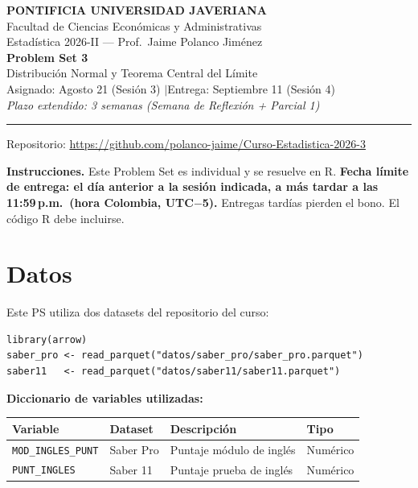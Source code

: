 \documentclass[11pt, a4paper]{article}
\begin{document}
\begin{center}
{\large\bfseries PONTIFICIA UNIVERSIDAD JAVERIANA}\\[3pt]
Facultad de Ciencias Econ\'omicas y Administrativas\\[2pt]
Estad\'istica 2026-II --- Prof.\ Jaime Polanco Jim\'enez\\[6pt]
{\LARGE\bfseries Problem Set 3}\\[3pt]
{\large Distribuci\'on Normal y Teorema Central del L\'imite}\\[6pt]
Asignado: Agosto 21 (Sesi\'on 3) \quad$|$\quad Entrega: Septiembre 11 (Sesi\'on 4)\\[3pt]
\textit{Plazo extendido: 3 semanas (Semana de Reflexi\'on + Parcial 1)}
\end{center}

\vspace{6pt}
\rule{\linewidth}{0.5pt}
\vspace{2pt}
{\centering\small Repositorio: \url{https://github.com/polanco-jaime/Curso-Estadistica-2026-3}\par}
\vspace{6pt}

\textbf{Instrucciones.} Este Problem Set es individual y se resuelve en R.
\textbf{Fecha l\'imite de entrega: el d\'ia anterior a la sesi\'on indicada, a m\'as tardar a las 11:59\,p.m.\ (hora Colombia, UTC$-$5).} Entregas tard\'ias pierden el bono. El c\'odigo R debe incluirse.

\section*{Datos}

Este PS utiliza dos datasets del repositorio del curso:

\begin{lstlisting}
library(arrow)
saber_pro <- read_parquet("datos/saber_pro/saber_pro.parquet")
saber11   <- read_parquet("datos/saber11/saber11.parquet")
\end{lstlisting}

\textbf{Diccionario de variables utilizadas:}

\vspace{4pt}
\begin{tabular}{l l l l}
\toprule
\textbf{Variable} & \textbf{Dataset} & \textbf{Descripci\'on} & \textbf{Tipo} \\
\midrule
\texttt{MOD\_INGLES\_PUNT} & Saber Pro & Puntaje m\'odulo de ingl\'es  & Num\'erico \\
\texttt{PUNT\_INGLES}      & Saber 11  & Puntaje prueba de ingl\'es   & Num\'erico \\
\bottomrule
\end{tabular}
\end{document}
